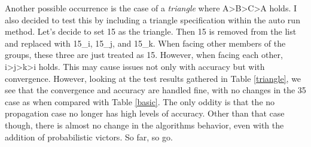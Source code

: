 \documentclass[11pt]{article}
\begin{document}
\noindent Another possible occurrence is the case of a \emph{triangle} where A>B>C>A holds. I also decided to test this by including a triangle specification within the auto run method. Let's decide to set 15 as the triangle. Then 15 is removed from the list and replaced with 15\_i, 15\_j, and 15\_k. When facing other members of the groups, these three are just treated as 15. However, when facing each other, i>j>k>i holds. This may cause issues not only with accuracy but with convergence. However, looking at the test results gathered in Table \ref{triangle}, we see that the convergence and accuracy are handled fine, with no changes in the 35 case as when compared with Table \ref{basic}. The only oddity is that the no propagation case no longer has high levels of accuracy. Other than that case though, there is almost no change in the algorithms behavior, even with the addition of probabilistic victors. So far, so go. 
\end{document}
